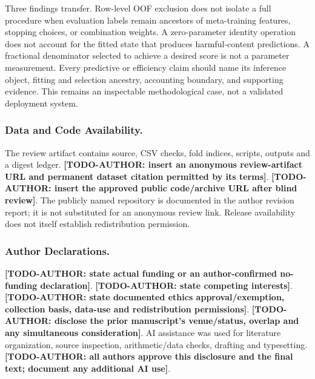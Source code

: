 \documentclass[doublecolumn]{ijcvsplatex}
\newcommand{\AuthorTodo}[1]{\textbf{[TODO-AUTHOR:\allowbreak{} #1]}}
\begin{document}
Three findings transfer. Row-level OOF exclusion does not isolate a full procedure when evaluation labels remain ancestors of meta-training features, stopping choices, or combination weights. A zero-parameter identity operation does not account for the fitted state that produces harmful-content predictions. A fractional denominator selected to achieve a desired score is not a parameter measurement. Every predictive or efficiency claim should name its inference object, fitting and selection ancestry, accounting boundary, and supporting evidence. This remains an inspectable methodological case, not a validated deployment system.

\subsubsection*{Data and Code Availability.}
The review artifact contains source, CSV checks, fold indices, scripts, outputs and a digest ledger. \AuthorTodo{insert an anonymous review-artifact URL and permanent dataset citation permitted by its terms}. \AuthorTodo{insert the approved public code/archive URL after blind review}. The publicly named repository is documented in the author revision report; it is not substituted for an anonymous review link. Release availability does not itself establish redistribution permission.

\subsubsection*{Author Declarations.}
\AuthorTodo{state actual funding or an author-confirmed no-funding declaration}. \AuthorTodo{state competing interests}. \AuthorTodo{state documented ethics approval/exemption, collection basis, data-use and redistribution permissions}. \AuthorTodo{disclose the prior manuscript's venue/status, overlap and any simultaneous consideration}. AI assistance was used for literature organization, source inspection, arithmetic/data checks, drafting and typesetting. \AuthorTodo{all authors approve this disclosure and the final text; document any additional AI use}.



\end{document}
